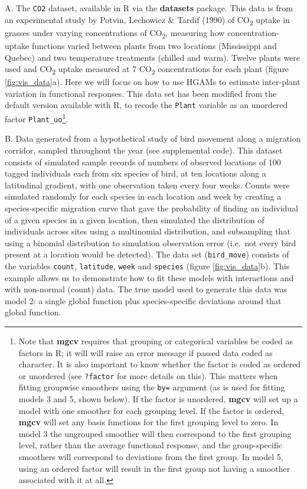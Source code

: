 \documentclass[12pt]{article}
\let\rmarkdownfootnote\footnote%
\def\footnote{\protect\rmarkdownfootnote}
\begin{document}
A. The \texttt{CO2} dataset, available in R via the \textbf{datasets}
package. This data is from an experimental study by Potvin, Lechowicz \&
Tardif (1990) of CO\textsubscript{2} uptake in grasses under varying
concentrations of CO\textsubscript{2}, measuring how
concentration-uptake functions varied between plants from two locations
(Mississippi and Quebec) and two temperature treatments (chilled and
warm). Twelve plants were used and CO\textsubscript{2} uptake measured
at 7 CO\textsubscript{2} concentrations for each plant (figure
\ref{fig:vis_data}a). Here we will focus on how to use HGAMs to estimate
inter-plant variation in functional responses. This data set has been
modified from the default version available with R, to recode the
\texttt{Plant} variable as an unordered factor
\texttt{Plant\_uo}\footnote{Note that \textbf{mgcv} requires that
  grouping or categorical variables be coded as factors in R; it will
  will raise an error message if passed data coded as character. It is
  also important to know whether the factor is coded as ordered or
  unordered (see \texttt{?factor} for more details on this). This
  matters when fitting groupwise smoothers using the \texttt{by=}
  argument (as is used for fitting models 3 and 5, shown below). If the
  factor is unordered, \textbf{mgcv} will set up a model with one
  smoother for each grouping level. If the factor is ordered,
  \textbf{mgcv} will set any basis functions for the first grouping
  level to zero. In model 3 the ungrouped smoother will then correspond
  to the first grouping level, rather than the average functional
  response, and the group-specific smoothers will correspond to
  deviations from the first group. In model 5, using an ordered factor
  will result in the first group not having a smoother associated with
  it at all.}.

B. Data generated from a hypothetical study of bird movement along a
migration corridor, sampled throughout the year (see supplemental code).
This dataset consists of simulated sample records of numbers of observed
locations of 100 tagged individuals each from six species of bird, at
ten locations along a latitudinal gradient, with one observation taken
every four weeks. Counts were simulated randomly for each species in
each location and week by creating a species-specific migration curve
that gave the probability of finding an individual of a given species in
a given location, then simulated the distribution of individuals across
sites using a multinomial distribution, and subsampling that using a
binomial distribution to simulation observation error (i.e.~not every
bird present at a location would be detected). The data set
(\texttt{bird\_move}) consists of the variables \texttt{count},
\texttt{latitude}, \texttt{week} and \texttt{species} (figure
\ref{fig:vis_data}b). This example allows us to demonstrate how to fit
these models with interactions and with non-normal (count) data. The
true model used to generate this data was model 2: a single global
function plus species-specific deviations around that global function.
\end{document}
